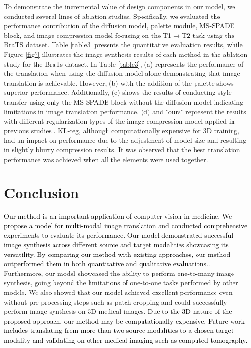 \documentclass[10pt,twocolumn,letterpaper]{article}
\newcommand{\jhk}[2]{\textcolor{black}{{}#2}}
\begin{document}
To demonstrate the incremental value of design components in our model, we conducted several lines of ablation studies. Specifically, we evaluated the performance contribution of the diffusion model, palette module, MS-SPADE block, and image compression model focusing on the T1$\rightarrow$T2 task using the BraTS dataset. Table \ref{table3} presents the quantitative evaluation results, while Figure \ref{fig7} illustrates the image synthesis results of each method in the ablation study for the BraTs dataset. In Table \ref{table3}, (a) represents the performance of the translation when using the diffusion model alone demonstrating that image translation is achievable. However, (b) with the addition of the palette shows superior performance. Additionally, (c) shows the results of conducting style transfer using only the MS-SPADE block without the diffusion model indicating limitations in image translation performance. (d) and "ours" represent the results with different regularization types of the image compression model applied in previous studies \cite{rombach2022high}. KL-reg, although computationally expensive for 3D training, had an impact on performance due to the adjustment of model size and resulting in slightly blurry compression results. It was observed that the best translation performance was achieved when all the elements were used together.

\section{Conclusion}
\jhk{}{Our method is an important application of computer vision in medicine. We propose a model for multi-modal image translation and conducted comprehensive experiments to evaluate its performance. Our model demonstrated successful image synthesis across different source and target modalities showcasing its versatility. By comparing our method with existing approaches, our method outperformed them in both quantitative and qualitative evaluations.}. Furthermore, our model showcased the ability to perform one-to-many image synthesis, going beyond the limitations of one-to-one tasks performed by other models. We also showed that our model achieved excellent performance even without pre-processing steps such as patch cropping and could successfully perform image synthesis on 3D medical images. \jhk{}{Due to the 3D nature of the proposed approach, our method may be computationally expensive. Future work includes translating from more than two source modalities to a chosen target modality and validating on other medical imaging such as computed tomography.}
\end{document}
